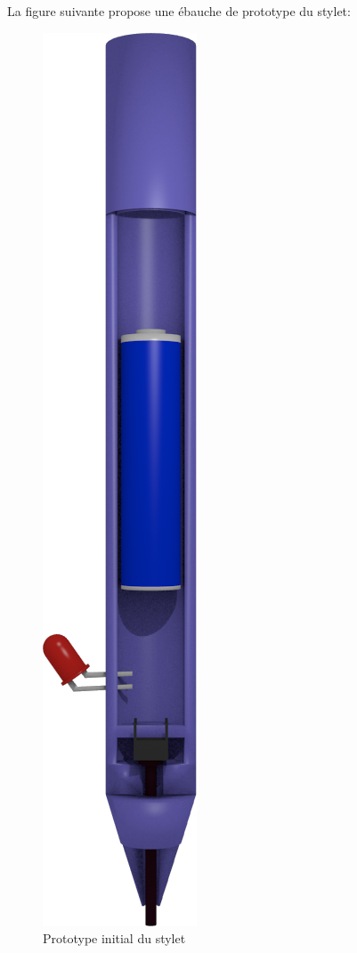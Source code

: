 \documentclass[11pt,a4paper,oldfontcommands]{memoir}
\begin{document}
La figure suivante propose une ébauche de prototype du stylet:

\newpage

\begin{figure}[h]
\centering
\includegraphics[scale=0.5]{images/stylus-first-design.png}
\caption{Prototype initial du stylet}
\end{figure}
\end{document}
